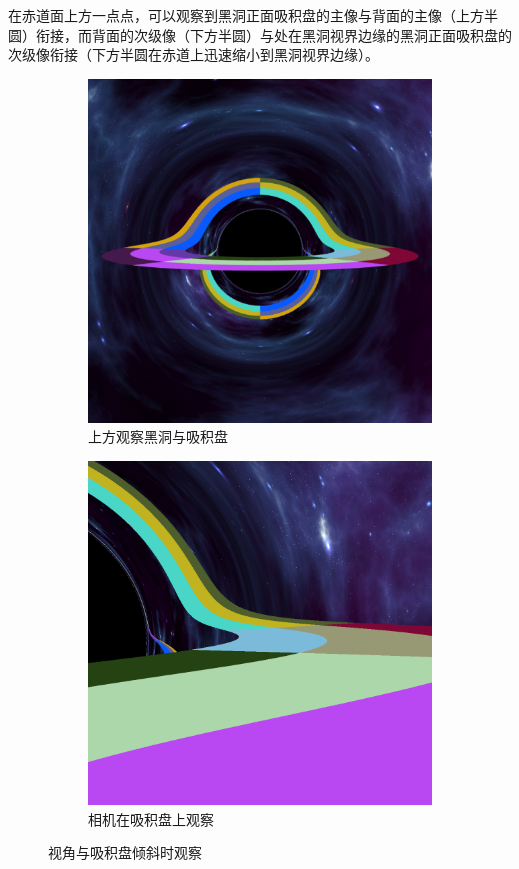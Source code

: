 在赤道面上方一点点，可以观察到黑洞正面吸积盘的主像与背面的主像（上方半圆）衔接，而背面的次级像（下方半圆）与处在黑洞视界边缘的黑洞正面吸积盘的次级像衔接（下方半圆在赤道上迅速缩小到黑洞视界边缘）。
\begin{figure}[H]
    \centering
    \begin{subfigure}{.5\textwidth}
        \centering
        \includegraphics[width=.8\linewidth]{images/above_equatorial_plane.png}
        \caption{上方观察黑洞与吸积盘}
        \label{fig:above_equatorial_plane}
    \end{subfigure}%
    \begin{subfigure}{.5\textwidth}
        \centering
        \includegraphics[width=.8\linewidth]{images/stand_on_disk.png}
        \caption{相机在吸积盘上观察}
        \label{fig:einstein-ring}
    \end{subfigure}
    \caption{视角与吸积盘倾斜时观察}
\end{figure}

